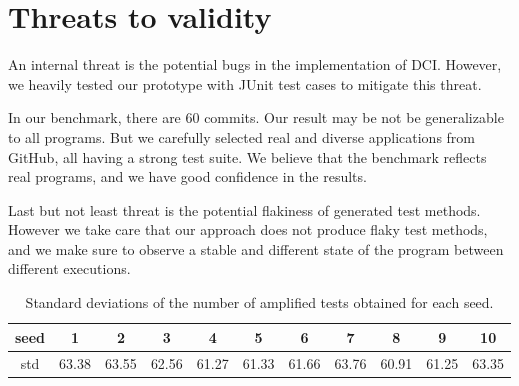\section{Threats to validity}
\label{sec:threats}

An internal threat is the potential bugs in the implementation of DCI. However, we heavily tested our prototype with JUnit test cases to mitigate this threat.

In our benchmark, there are 60 commits. Our result may be not be generalizable to all programs. But we carefully selected real and diverse applications from GitHub, all having a strong test suite. We believe that the benchmark reflects real programs, and we have good confidence in the results.

Last but not least threat is the potential flakiness of generated test methods.
However we take care that our approach does not produce flaky test methods, and we make sure to observe a stable and different state of the program between different executions. 

\begin{table}
\def\arraystretch{1}%
\setlength\tabcolsep{3pt} %
\caption{Standard deviations of the number of amplified tests obtained for each seed.}
\begin{tabular}{c|cccccccccc}
seed     & 1 & 2 & 3 & 4 & 5 & 6 & 7 & 8 & 9 & 10 \\
\hline
std     & 63.38&63.55&62.56&61.27&61.33&61.66&63.76&60.91&61.25&63.35
\end{tabular}
\end{table}

